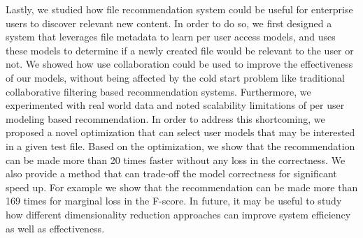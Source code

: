 \documentclass[12pt]{ucsddissertation}
\begin{document}
Lastly, we studied how file recommendation system could be useful for enterprise users to discover relevant new content. In order to do so, we first designed a system that leverages file metadata to learn per user access models, and uses these models to determine if a newly created file would be relevant to the user or not. We showed how use collaboration could be used to improve the effectiveness of our models, without being affected by the cold start problem like traditional collaborative filtering based recommendation systems. Furthermore, we experimented with real world data and noted scalability limitations of per user modeling based recommendation. In order to address this shortcoming, we proposed a novel optimization that can select user models that may be interested in a given test file. Based on the optimization, we show that the recommendation can be made more than 20 times faster without any loss in the correctness. We also provide a method that can trade-off the model correctness for significant speed up. For example we show that the recommendation can be made more than 169 times for marginal loss in the F-score. In future, it may be useful to study how different dimensionality reduction approaches can improve system efficiency as well as effectiveness. 




\backmatter

\end{document}
